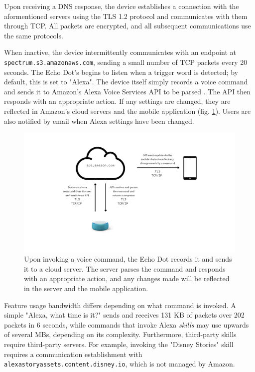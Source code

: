 \documentclass[12pt]{ucthesis}
\begin{document}
Upon receiving a DNS response, the device establishes a connection with the aformentioned servers using the TLS 1.2 protocol and communicates with them through TCP. All packets are encrypted, and all subsequent communications use the same protocols.

When inactive, the device intermittently communicates with an endpoint at \\\texttt{spectrum.s3.amazonaws.com}, sending a small number of TCP packets every 20 seconds. The Echo Dot's begins to listen when a trigger word is detected; by default, this is set to "Alexa". The device itself simply records a voice command and sends it to Amazon's Alexa Voice Services API to be parsed \cite{alexa}. The API then responds with an appropriate action. If any settings are changed, they are reflected in Amazon's cloud servers and the mobile application (fig. \ref{fig:voicecom}). Users are also notified by email when Alexa settings have been changed.

\begin{figure}
    \includegraphics[width=\textwidth]{voice command.jpg}
    \caption{Upon invoking a voice command, the Echo Dot records it and sends it to a cloud server. The server parses the command and responds with an appropriate action, and any changes made will be reflected in the server and the mobile application.}
    \label{fig:voicecom}
\end{figure}

Feature usage bandwidth differs depending on what command is invoked. A simple "Alexa, what time is it?" sends and receives 131 KB of packets over 202 packets in 6 seconds, while commands that invoke Alexa \textit{skills} may use upwards of several MBs, depending on its complexity. Furthermore, third-party skills require third-party servers. For example, invoking the "Disney Stories" skill requires a communication establishment with \texttt{alexastoryassets.content.disney.io}, which is not managed by Amazon.
\end{document}
